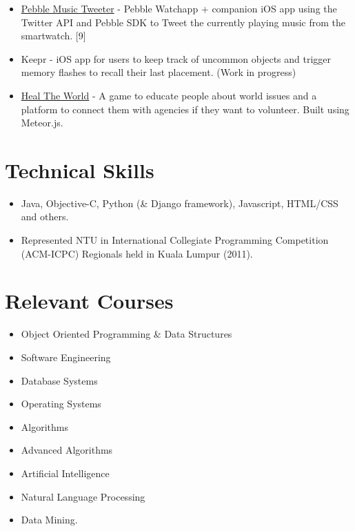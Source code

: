\begin{itemize}
  \begin{itemize}
  \tightlist
  \item
    \href{https://github.com/radzinzki/Pebble-MusicTweeter}{Pebble Music
    Tweeter} - Pebble Watchapp + companion iOS app using the Twitter API
    and Pebble SDK to Tweet the currently playing music from the
    smartwatch. {[}9{]}
  \item
    Keepr - iOS app for users to keep track of uncommon objects and
    trigger memory flashes to recall their last placement. (Work in
    progress)
  \item
    \href{http://healtheworld.meteor.com/}{Heal The World} - A game to
    educate people about world issues and a platform to connect them
    with agencies if they want to volunteer. Built using Meteor.js.
  \end{itemize}
\end{itemize}

\section{Technical Skills}\label{technical-skills}

\begin{itemize}
\tightlist
\item
  Java, Objective-C, Python (\& Django framework), Javascript, HTML/CSS
  and others.
\item
  Represented NTU in International Collegiate Programming Competition
  (ACM-ICPC) Regionals held in Kuala Lumpur (2011).
\end{itemize}

\section{Relevant Courses}\label{relevant-courses}

\begin{itemize}
\tightlist
\item
  Object Oriented Programming \& Data Structures
\item
  Software Engineering
\item
  Database Systems
\item
  Operating Systems
\item
  Algorithms
\item
  Advanced Algorithms
\item
  Artificial Intelligence
\item
  Natural Language Processing
\item
  Data Mining.
\end{itemize}

